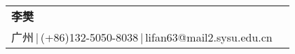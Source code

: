 \newcommand{\myheader}{
	\begin{tabular*}{\textwidth}{ll}
		\textbf{{\LARGE 李樊}}\\
		{广州}$\,$|$\,${(+86)132-5050-8038}$\,$|$\,${lifan63@mail2.sysu.edu.cn}\\
	\end{tabular*}\\\vspace{0.1in}}
\myheader